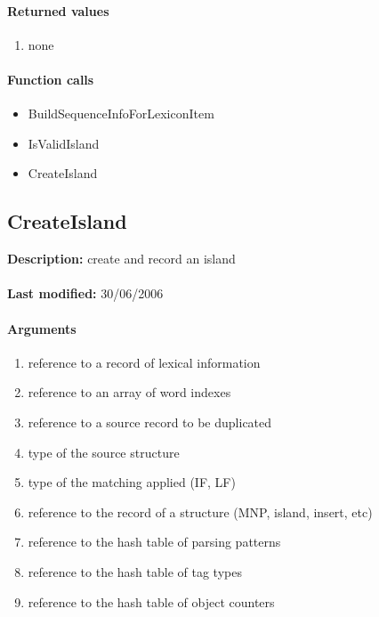 \paragraph{Returned values}
\begin{enumerate}
\item none
\end{enumerate}

\paragraph{Function calls}
\begin{itemize}
\item BuildSequenceInfoForLexiconItem
\item IsValidIsland
\item CreateIsland
\end{itemize}

\subsection{CreateIsland}
\textbf{Description:} create and record an island\\
\\\textbf{Last modified:} 30/06/2006

\paragraph{Arguments}
\begin{enumerate}
\item reference to a record of lexical information
\item reference to an array of word indexes
\item reference to a source record to be duplicated
\item type of the source structure
\item type of the matching applied (IF, LF)
\item reference to the record of a structure (MNP, island, insert, etc)
\item reference to the hash table of parsing patterns
\item reference to the hash table of tag types
\item reference to the hash table of object counters
\end{enumerate}

